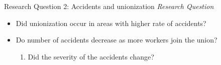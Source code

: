 \begin{frame}{Research Question 2: Accidents and unionization}
\emph{Research Question}
\begin{itemize}
    \item Did unionization occur in areas with higher rate of accidents?
    \item Do number of accidents decrease as more workers join the union?
    \begin{enumerate}
        \item Did the severity of the accidents change?
    \end{enumerate}
\end{itemize}
\end{frame}